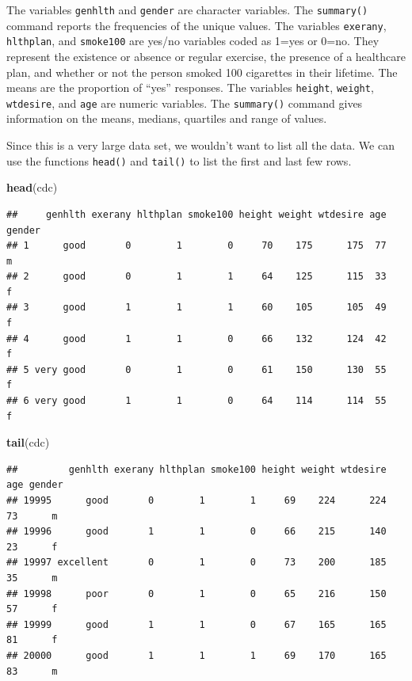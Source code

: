 \documentclass[
]{book}
\newenvironment{Shaded}{\begin{snugshade}}{\end{snugshade}}
\newcommand{\KeywordTok}[1]{\textcolor[rgb]{0.13,0.29,0.53}{\textbf{#1}}}
\newcommand{\NormalTok}[1]{#1}
\begin{document}
The variables \texttt{genhlth} and \texttt{gender} are character variables. The \texttt{summary()} command reports the frequencies of the unique values. The variables \texttt{exerany}, \texttt{hlthplan}, and \texttt{smoke100} are yes/no variables coded as 1=yes or 0=no. They represent the existence or absence or regular exercise, the presence of a healthcare plan, and whether or not the person smoked 100 cigarettes in their lifetime. The means are the proportion of ``yes'' responses. The variables \texttt{height}, \texttt{weight}, \texttt{wtdesire}, and \texttt{age} are numeric variables. The \texttt{summary()} command gives information on the means, medians, quartiles and range of values.

Since this is a very large data set, we wouldn't want to list all the data. We can use the functions \texttt{head()} and \texttt{tail()} to list the first and last few rows.

\begin{Shaded}
\begin{Highlighting}[]
\KeywordTok{head}\NormalTok{(cdc)}
\end{Highlighting}
\end{Shaded}

\begin{verbatim}
##     genhlth exerany hlthplan smoke100 height weight wtdesire age gender
## 1      good       0        1        0     70    175      175  77      m
## 2      good       0        1        1     64    125      115  33      f
## 3      good       1        1        1     60    105      105  49      f
## 4      good       1        1        0     66    132      124  42      f
## 5 very good       0        1        0     61    150      130  55      f
## 6 very good       1        1        0     64    114      114  55      f
\end{verbatim}

\begin{Shaded}
\begin{Highlighting}[]
\KeywordTok{tail}\NormalTok{(cdc)}
\end{Highlighting}
\end{Shaded}

\begin{verbatim}
##         genhlth exerany hlthplan smoke100 height weight wtdesire age gender
## 19995      good       0        1        1     69    224      224  73      m
## 19996      good       1        1        0     66    215      140  23      f
## 19997 excellent       0        1        0     73    200      185  35      m
## 19998      poor       0        1        0     65    216      150  57      f
## 19999      good       1        1        0     67    165      165  81      f
## 20000      good       1        1        1     69    170      165  83      m
\end{verbatim}
\end{document}
